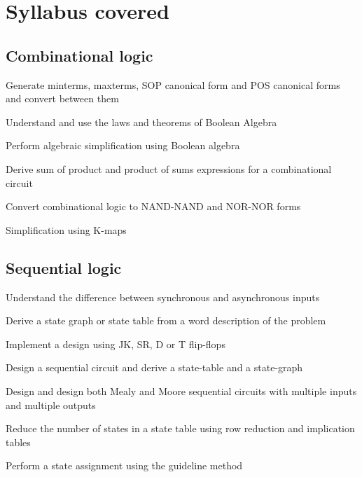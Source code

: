 \documentclass[options]{article}
\newcommand{\cmark}{\ding{51}}%
\newcommand{\done}{\rlap{$\square$}{\raisebox{2pt}{\large\hspace{1pt}\cmark}}%
  \hspace{-2.5pt}}
\begin{document}
\section{Syllabus covered}
\subsection{Combinational logic}
\begin{todolist}
  \item[\done] Generate minterms, maxterms, SOP canonical form and POS
    canonical forms and convert between them\\
  \item[\done]  Understand and use the laws and theorems of Boolean Algebra
  \item[\done]  Perform algebraic simplification using Boolean algebra
  \item[\done]  Derive sum of product and product of sums expressions for a combinational circuit
  \item[\done]  Convert combinational logic to NAND-NAND and NOR-NOR forms
  \item[\done] Simplification using K-maps
\end{todolist}

\subsection{Sequential logic}
\begin{todolist}
  \item[\done] Understand the difference between synchronous and asynchronous inputs
  \item[\done] Derive a state graph or state table from a word description of the problem
  \item[\done] Implement a design using JK, SR, D or T flip-flops
  \item[\done] Design a sequential circuit and derive a state-table and a state-graph
  \item[\done] Design and design both Mealy and Moore sequential circuits with multiple inputs and multiple outputs
  \item[\done] Reduce the number of states in a state table using row reduction and implication tables
  \item[\done] Perform a state assignment using the guideline method
\end{todolist}
\end{document}
